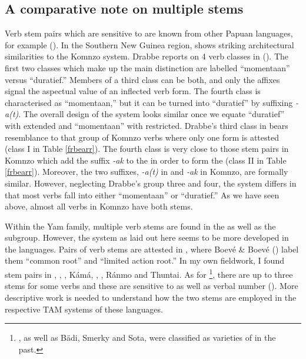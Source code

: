 \subsection{A comparative note on multiple stems} \label{comparativenoteextrs}

Verb stem pairs which are sensitive to  are known from other Papuan languages, for example  (\citealt[245]{Fedden:2011wu}). In the Southern New Guinea region,  shows striking architectural similarities to the Komnzo system. Drabbe reports on 4 verb classes in  (\citeyear[31]{Drabbe:1955tm}). The first two classes which make up the main distinction are labelled ``momentaan'' versus ``duratief.'' Members of a third class can be both, and only the affixes signal the aspectual value of an inflected verb form. The fourth class is characterised as ``momentaan,'' but it can be turned into ``duratief'' by suffixing \emph{-a(t)}. The overall design of the  system looks similar once we equate ``duratief'' with extended and ``momentaan'' with restricted. Drabbe's third class in  bears resemblance to that group of Komnzo verbs where only one form is attested (class I in Table \ref{frbearr}). The fourth class is very close to those stem pairs in Komnzo which add the suffix \emph{-ak} to the  in order to form the  (class II in Table \ref{frbearr}). Moreover, the two suffixes, \emph{-a(t)} in  and \emph{-ak} in Komnzo, are formally similar. However, neglecting Drabbe's group three and four, the  system differs in that most verbs fall into either ``momentaan'' or ``duratief.'' As we have seen above, almost all verbs in Komnzo have both stems.%

Within the Yam family, multiple verb stems are found in the  as well as the  subgroup. However, the system as laid out here seems to be more developed in the  languages. Pairs of verb stems are attested in , where Boevé \& Boevé (\citeyear{Bouve:2003ar}) label them ``common root'' and ``limited action root.'' In my own fieldwork, I found stem pairs in , , , Kámá, , , Ránmo and  Thuntai. As for \footnote{, as well as Bädi, Smerky and Sota, were classified as varieties of  in the past.}, there are up to three stems for some verbs and these are sensitive to  as well as verbal number (\citealt{Carroll:Ngkolmpu}). More descriptive work is needed to understand how the two stems are employed in the respective TAM systems of these languages.%

